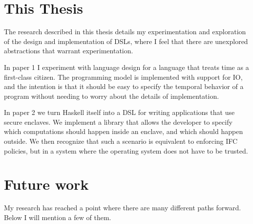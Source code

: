 \section{This Thesis}

The research described in this thesis details my experimentation and exploration of the design and implementation of
DSLs, where I feel that there are unexplored abstractions that warrant experimentation.

In paper 1 I experiment with language design for a language that treats time as a first-class citizen. The programming model
is implemented with support for IO, and the intention is that it should be easy to specify the temporal behavior of a program
without needing to worry about the details of implementation.

In paper 2 we turn Haskell itself into a DSL for writing applications that use secure enclaves. We implement a library that
allows the developer to specify which computations should happen inside an enclave, and which should happen outside. We
then recognize that such a scenario is equivalent to enforcing IFC policies, but in a system where the operating system
does not have to be trusted.

\section{Future work}

My research has reached a point where there are many different paths forward. Below I will mention a few of them.

